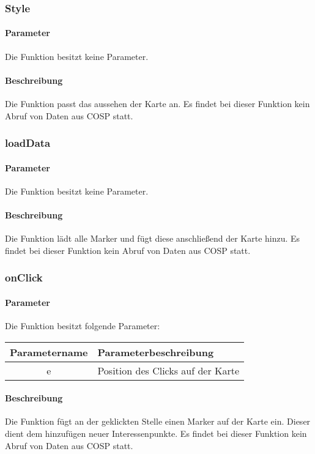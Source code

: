 \subsubsection{Style}
\paragraph{Parameter} Die Funktion besitzt keine Parameter.
\paragraph{Beschreibung} Die Funktion passt das aussehen der Karte an. Es findet bei dieser Funktion kein Abruf von Daten aus {\glqq COSP\grqq} statt.
\subsubsection{loadData}
\paragraph{Parameter} Die Funktion besitzt keine Parameter.
\paragraph{Beschreibung} Die Funktion lädt alle Marker und fügt diese anschließend der Karte hinzu. Es findet bei dieser Funktion kein Abruf von Daten aus {\glqq COSP\grqq} statt.
\subsubsection{onClick}
\paragraph{Parameter} Die Funktion besitzt folgende Parameter:
\begin{table}[H]
	\begin{tabular}{|c|p{11cm}|}
		\hline
		\textbf{Parametername} & \textbf{Parameterbeschreibung} \\ \hline
		e & Position des Clicks auf der Karte \\ \hline
	\end{tabular}
\end{table}
\paragraph{Beschreibung} Die Funktion fügt an der geklickten Stelle einen Marker auf der Karte ein. Dieser dient dem hinzufügen neuer Interessenpunkte. Es findet bei dieser Funktion kein Abruf von Daten aus {\glqq COSP\grqq} statt.

